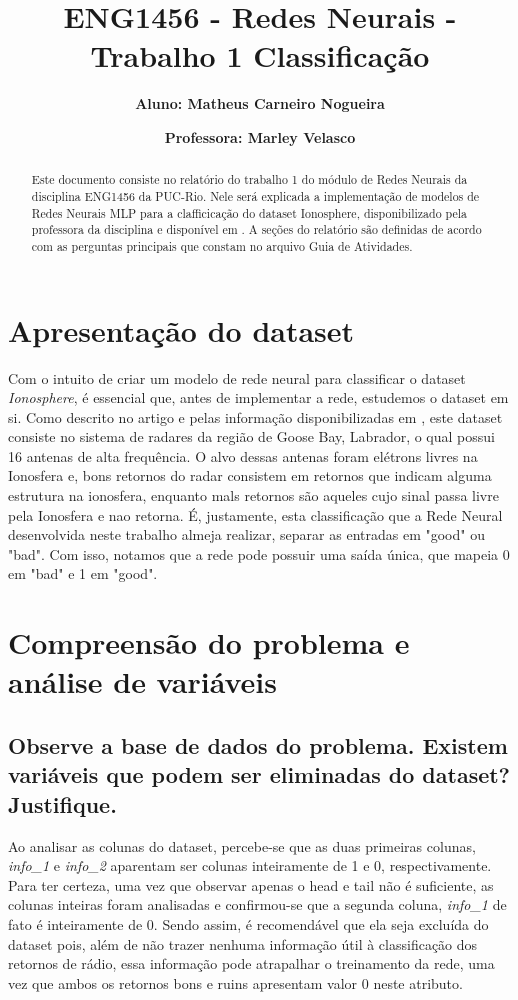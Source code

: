 \documentclass[12pt]{article}
\title{\textbf{ENG1456 - Redes Neurais - Trabalho 1 Classificação}}
\author{\textbf{Aluno: Matheus Carneiro Nogueira}}
\affil{}
\author{\textbf{Professora: Marley Velasco}}
\affil{}
\date{}
\begin{document}
	\maketitle
	\tableofcontents
	
\begin{abstract}
	Este documento consiste no relatório do trabalho 1 do módulo de Redes Neurais da disciplina ENG1456 da PUC-Rio. Nele será explicada a implementação de modelos de Redes Neurais MLP para a clafficicação do dataset Ionosphere, disponibilizado pela professora da disciplina e disponível em \cite{Dataset}. A seções do relatório são definidas de acordo com as perguntas principais que constam no arquivo Guia de Atividades.
\end{abstract}

\section{Apresentação do dataset}\label{sec:apresentacao}

Com o intuito de criar um modelo de rede neural para classificar o dataset \textit{Ionosphere}, é essencial que, antes de implementar a rede, estudemos o dataset em si. Como descrito no artigo \cite{Paper1989} e pelas informação disponibilizadas em \cite{Dataset}, este dataset consiste no sistema de radares da região de Goose Bay, Labrador, o qual possui 16 antenas de alta frequência. O alvo dessas antenas foram elétrons livres na Ionosfera e, bons retornos do radar consistem em retornos que indicam alguma estrutura na ionosfera, enquanto mals retornos são aqueles cujo sinal passa livre pela Ionosfera e nao retorna. É, justamente, esta classificação que a Rede Neural desenvolvida neste trabalho almeja realizar, separar as entradas em "good" ou "bad". Com isso, notamos que a rede pode possuir uma saída única, que mapeia 0 em "bad" e 1 em "good".

\section{Compreensão do problema e análise de variáveis}

\subsection{Observe a base de dados do problema. Existem variáveis que podem ser	eliminadas do dataset? Justifique.}\label{subsec:eliminadas}

Ao analisar as colunas do dataset, percebe-se que as duas primeiras colunas, \textit{info\_1} e \textit{info\_2} aparentam ser colunas inteiramente de 1 e 0, respectivamente. Para ter certeza, uma vez que observar apenas o head e tail não é suficiente, as colunas inteiras foram analisadas e confirmou-se que a segunda coluna, \textit{info\_1} de fato é inteiramente de 0. Sendo assim, é recomendável que ela seja excluída do dataset pois, além de não trazer nenhuma informação útil à classificação dos retornos de rádio, essa informação pode atrapalhar o treinamento da rede, uma vez que ambos os retornos bons e ruins apresentam valor 0 neste atributo.
\end{document}
